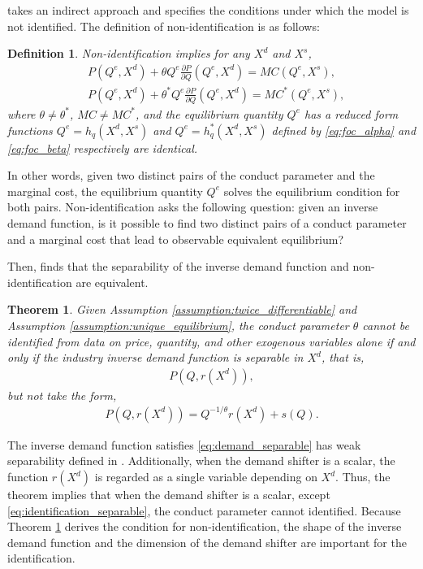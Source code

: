 \documentclass[11pt, a4paper]{article}
\newtheorem{theorem}{Theorem}
\newtheorem{definition}{Definition}
\theoremstyle{remark}
\begin{document}
\citet{lau1982identifying} takes an indirect approach and specifies the conditions under which the model is not identified.
The definition of non-identification is as follows:
\begin{definition}\label{def:non_identification}
    Non-identification implies for any $X^{d}$ and $X^{s}$,
    \begin{align}
    & P(Q^e, X^{d}) + \theta Q^e\frac{\partial P}{\partial Q}(Q^e, X^{d}) = MC(Q^e, X^{s}) ,  \label{eq:foc_alpha}\\
    & P(Q^e, X^{d}) + \theta^{*} Q^e\frac{\partial P}{\partial Q}(Q^e, X^{d}) = MC^{*}(Q^e, X^{s}),\label{eq:foc_beta}
    \end{align}
    where $\theta \neq \theta^{*}$, $MC \ne MC^{*}$, and the equilibrium quantity $Q^e$ has a reduced form functions $Q^e = h_q(X^{d}, X^{s})$ and $Q^e = h_q^{*}(X^{d}, X^{s})$ defined by \eqref{eq:foc_alpha} and \eqref{eq:foc_beta} respectively are identical.
\end{definition}
In other words, given two distinct pairs of the conduct parameter and the marginal cost, the equilibrium quantity $Q^e$ solves the equilibrium condition for both pairs.
Non-identification asks the following question: given an inverse demand function, is it possible to find two distinct pairs of a conduct parameter and a marginal cost that lead to observable equivalent equilibrium?

Then, \citet{lau1982identifying} finds that the separability of the inverse demand function and non-identification are equivalent.
\begin{theorem}\label{theorem_lau}
    Given Assumption \ref{assumption:twice_differentiable} and Assumption \ref{assumption:unique_equilibrium},
    the conduct parameter $\theta$ cannot be identified from data on price, quantity, and other exogenous variables alone if and only if the industry inverse demand function is separable in $X^{d}$, that is,
    \begin{align}
        P(Q, r(X^{d})), \label{eq:demand_separable}
    \end{align}
    but not take the form, 
    \begin{align}
        P(Q, r(X^{d})) = Q^{-1/\theta}r(X^{d}) + s(Q). \label{eq:identification_separable}
    \end{align}
\end{theorem}
The inverse demand function satisfies \eqref{eq:demand_separable} has weak separability defined in \citet{goldmanNote1964}.
Additionally, when the demand shifter is a scalar, the function $r(X^{d})$ is regarded as a single variable depending on $X^{d}$.
Thus, the theorem implies that when the demand shifter is a scalar, except \eqref{eq:identification_separable}, the conduct parameter cannot identified.
Because Theorem \ref{theorem_lau} derives the condition for non-identification, the shape of the inverse demand function and the dimension of the demand shifter are important for the identification.
\end{document}
